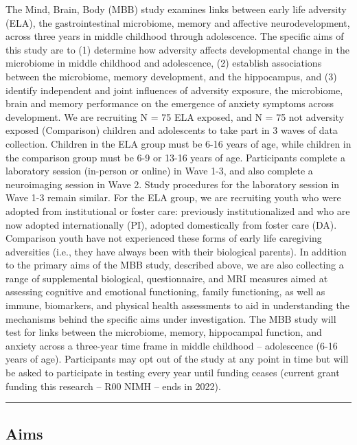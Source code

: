 \documentclass[]{book}
\begin{document}
The Mind, Brain, Body (MBB) study examines links between early life adversity (ELA), the gastrointestinal microbiome, memory and affective neurodevelopment, across three years in middle childhood through adolescence. The specific aims of this study are to (1) determine how adversity affects developmental change in the microbiome in middle childhood and adolescence, (2) establish associations between the microbiome, memory development, and the hippocampus, and (3) identify independent and joint influences of adversity exposure, the microbiome, brain and memory performance on the emergence of anxiety symptoms across development. We are recruiting N = 75 ELA exposed, and N = 75 not adversity exposed (Comparison) children and adolescents to take part in 3 waves of data collection. Children in the ELA group must be 6-16 years of age, while children in the comparison group must be 6-9 or 13-16 years of age. Participants complete a laboratory session (in-person or online) in Wave 1-3, and also complete a neuroimaging session in Wave 2. Study procedures for the laboratory session in Wave 1-3 remain similar. For the ELA group, we are recruiting youth who were adopted from institutional or foster care: previously institutionalized and who are now adopted internationally (PI), adopted domestically from foster care (DA). Comparison youth have not experienced these forms of early life caregiving adversities (i.e., they have always been with their biological parents). In addition to the primary aims of the MBB study, described above, we are also collecting a range of supplemental biological, questionnaire, and MRI measures aimed at assessing cognitive and emotional functioning, family functioning, as well as immune, biomarkers, and physical health assessments to aid in understanding the mechanisms behind the specific aims under investigation. The MBB study will test for links between the microbiome, memory, hippocampal function, and anxiety across a three-year time frame in middle childhood -- adolescence (6-16 years of age). Participants may opt out of the study at any point in time but will be asked to participate in testing every year until funding ceases (current grant funding this research -- R00 NIMH -- ends in 2022).

\begin{center}\rule{0.5\linewidth}{0.5pt}\end{center}

\hypertarget{aims}{%
\subsection{Aims}\label{aims}}
\end{document}
